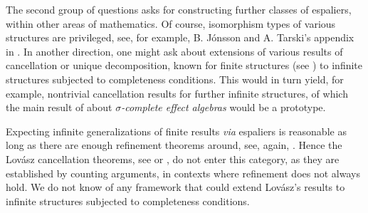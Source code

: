 \documentclass[psamsfonts,reqno]{memo-l}
\theoremstyle{plain}
\theoremstyle{definition}
\theoremstyle{remark}
\numberwithin{equation}{section}
\begin{document}
The second group of questions asks for constructing further classes of
espaliers, within other areas of mathematics. Of course, isomorphism types
of various structures are privileged, see, for example, B. J\'onsson and
A. Tarski's appendix in
\cite{Tars}. In another direction, one might ask about extensions of various
results of cancellation or unique decomposition, known for finite
structures (see \cite[Chapter~5]{MMTa})
%
to infinite structures subjected to completeness conditions. This would in
turn yield, for example, nontrivial cancellation results for further infinite
structures, of which the main result of \cite{Jenc}
about \emph{$\sigma$-complete effect algebras} would be a prototype.

Expecting infinite generalizations of finite results \emph{via} espaliers is
reasonable as long as there are enough refinement theorems around, see,
again, \cite[Chapter~5]{MMTa}. Hence the Lov\'asz cancellation theorems, see
\cite{Lova67} or \cite[Section~5.7]{MMTa}, do not enter
this category, as they are established by counting arguments, in contexts
where refinement does not always hold.
We do not know of any framework that could extend Lov\'asz's results to
infinite structures subjected to completeness conditions.
\end{document}
